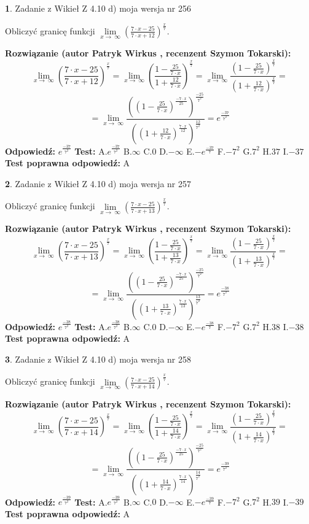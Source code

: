 \documentclass[12pt, a4paper]{article}
\theoremstyle{definition} %
\newtheorem{zad}{}
\newcommand{\zadStart}[1]{\begin{zad}#1\newline}
\newcommand{\zadStop}{\end{zad}}
\newcommand{\rozwStart}[2]{\noindent \textbf{Rozwiązanie (autor #1 , recenzent #2): }\newline}
\newcommand{\rozwStop}{\newline}
\newcommand{\odpStart}{\noindent \textbf{Odpowiedź:}\newline}
\newcommand{\odpStop}{\newline}
\newcommand{\testStart}{\noindent \textbf{Test:}\newline}
\newcommand{\testStop}{\newline}
\newcommand{\kluczStart}{\noindent \textbf{Test poprawna odpowiedź:}\newline}
\newcommand{\kluczStop}{\newline}
\begin{document}
\zadStart{Zadanie z Wikieł Z 4.10 d) moja wersja nr 256}


Obliczyć granicę funkcji  $\lim\limits_{x\to\ \infty}(\frac{7\cdot x-25}{7\cdot x+12})^{\frac{x}{7}}$.
\zadStop
\rozwStart{Patryk Wirkus}{Szymon Tokarski}
$$\lim\limits_{x\to\ \infty}(\frac{7\cdot x-25}{7\cdot x+12})^{\frac{x}{7}} = \lim\limits_{x\to\ \infty}(\frac{1-\frac{25}{7\cdot x}}{1+\frac{12}{7\cdot x}})^{\frac{x}{7}}=\lim\limits_{x\to\ \infty}\frac{(1-\frac{25}{7\cdot x})^{\frac{x}{7}}}{(1+\frac{12}{7\cdot x})^{\frac{x}{7}}}=$$
$$=\lim\limits_{x\to\ \infty}\frac{((1-\frac{25}{7\cdot x})^{\frac{-7\cdot x}{25}})^{\frac{-25}{7^{2}}}}{((1+\frac{12}{7\cdot x})^{\frac{7\cdot x}{12}})^{\frac{12}{7^{2}}}}=e^{\frac{-37}{7^{2}}}$$
\rozwStop
\odpStart
$e^{\frac{-37}{7^{2}}}$
\odpStop
\testStart
A.$e^{\frac{-37}{7^{2}}}$ B.$\infty$ C.$0$ D.$-\infty$ E.$-e^{\frac{-37}{7}}$
F.$-7^{2}$ G.$7^{2}$
H.$37$
I.$-37$
\testStop
\kluczStart
A
\kluczStop



\zadStart{Zadanie z Wikieł Z 4.10 d) moja wersja nr 257}


Obliczyć granicę funkcji  $\lim\limits_{x\to\ \infty}(\frac{7\cdot x-25}{7\cdot x+13})^{\frac{x}{7}}$.
\zadStop
\rozwStart{Patryk Wirkus}{Szymon Tokarski}
$$\lim\limits_{x\to\ \infty}(\frac{7\cdot x-25}{7\cdot x+13})^{\frac{x}{7}} = \lim\limits_{x\to\ \infty}(\frac{1-\frac{25}{7\cdot x}}{1+\frac{13}{7\cdot x}})^{\frac{x}{7}}=\lim\limits_{x\to\ \infty}\frac{(1-\frac{25}{7\cdot x})^{\frac{x}{7}}}{(1+\frac{13}{7\cdot x})^{\frac{x}{7}}}=$$
$$=\lim\limits_{x\to\ \infty}\frac{((1-\frac{25}{7\cdot x})^{\frac{-7\cdot x}{25}})^{\frac{-25}{7^{2}}}}{((1+\frac{13}{7\cdot x})^{\frac{7\cdot x}{13}})^{\frac{13}{7^{2}}}}=e^{\frac{-38}{7^{2}}}$$
\rozwStop
\odpStart
$e^{\frac{-38}{7^{2}}}$
\odpStop
\testStart
A.$e^{\frac{-38}{7^{2}}}$ B.$\infty$ C.$0$ D.$-\infty$ E.$-e^{\frac{-38}{7}}$
F.$-7^{2}$ G.$7^{2}$
H.$38$
I.$-38$
\testStop
\kluczStart
A
\kluczStop



\zadStart{Zadanie z Wikieł Z 4.10 d) moja wersja nr 258}


Obliczyć granicę funkcji  $\lim\limits_{x\to\ \infty}(\frac{7\cdot x-25}{7\cdot x+14})^{\frac{x}{7}}$.
\zadStop
\rozwStart{Patryk Wirkus}{Szymon Tokarski}
$$\lim\limits_{x\to\ \infty}(\frac{7\cdot x-25}{7\cdot x+14})^{\frac{x}{7}} = \lim\limits_{x\to\ \infty}(\frac{1-\frac{25}{7\cdot x}}{1+\frac{14}{7\cdot x}})^{\frac{x}{7}}=\lim\limits_{x\to\ \infty}\frac{(1-\frac{25}{7\cdot x})^{\frac{x}{7}}}{(1+\frac{14}{7\cdot x})^{\frac{x}{7}}}=$$
$$=\lim\limits_{x\to\ \infty}\frac{((1-\frac{25}{7\cdot x})^{\frac{-7\cdot x}{25}})^{\frac{-25}{7^{2}}}}{((1+\frac{14}{7\cdot x})^{\frac{7\cdot x}{14}})^{\frac{14}{7^{2}}}}=e^{\frac{-39}{7^{2}}}$$
\rozwStop
\odpStart
$e^{\frac{-39}{7^{2}}}$
\odpStop
\testStart
A.$e^{\frac{-39}{7^{2}}}$ B.$\infty$ C.$0$ D.$-\infty$ E.$-e^{\frac{-39}{7}}$
F.$-7^{2}$ G.$7^{2}$
H.$39$
I.$-39$
\testStop
\kluczStart
A
\kluczStop
\end{document}
